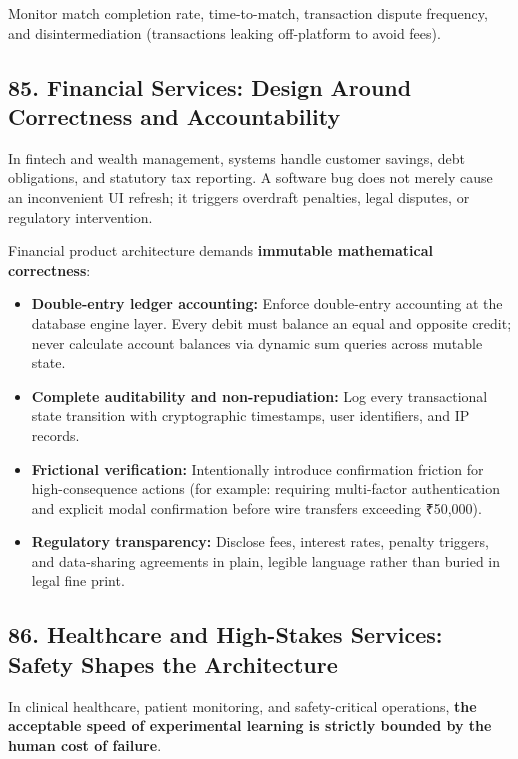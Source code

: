 Monitor match completion rate, time-to-match, transaction dispute frequency, and disintermediation (transactions leaking off-platform to avoid fees).

\subsection*{85. Financial Services: Design Around Correctness and Accountability}

In fintech and wealth management, systems handle customer savings, debt obligations, and statutory tax reporting. A software bug does not merely cause an inconvenient UI refresh; it triggers overdraft penalties, legal disputes, or regulatory intervention.

Financial product architecture demands \textbf{immutable mathematical correctness}:
\begin{itemize}
    \item \textbf{Double-entry ledger accounting:} Enforce double-entry accounting at the database engine layer. Every debit must balance an equal and opposite credit; never calculate account balances via dynamic sum queries across mutable state.
    \item \textbf{Complete auditability and non-repudiation:} Log every transactional state transition with cryptographic timestamps, user identifiers, and IP records.
    \item \textbf{Frictional verification:} Intentionally introduce confirmation friction for high-consequence actions (for example: requiring multi-factor authentication and explicit modal confirmation before wire transfers exceeding ₹50,000).
    \item \textbf{Regulatory transparency:} Disclose fees, interest rates, penalty triggers, and data-sharing agreements in plain, legible language rather than buried in legal fine print.
\end{itemize}

\subsection*{86. Healthcare and High-Stakes Services: Safety Shapes the Architecture}

In clinical healthcare, patient monitoring, and safety-critical operations, \textbf{the acceptable speed of experimental learning is strictly bounded by the human cost of failure}.

